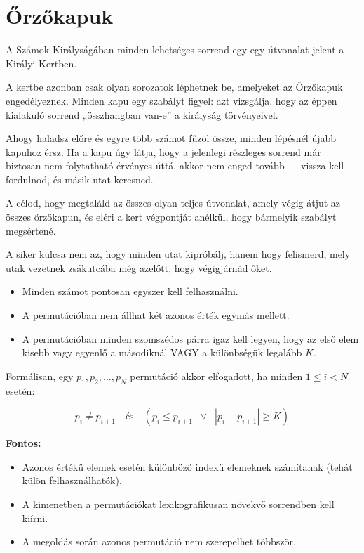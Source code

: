 \documentclass[12pt,a4paper]{article}
\begin{document}
\section{Őrzőkapuk}

A Számok Királyságában minden lehetséges sorrend egy-egy útvonalat jelent a Királyi Kertben.

A kertbe azonban csak olyan sorozatok léphetnek be, amelyeket az Őrzőkapuk engedélyeznek. Minden kapu egy szabályt figyel: azt vizsgálja, hogy az éppen kialakuló sorrend „összhangban van-e” a királyság törvényeivel.

Ahogy haladsz előre és egyre több számot fűzöl össze, minden lépésnél újabb kapuhoz érsz. Ha a kapu úgy látja, hogy a jelenlegi részleges sorrend már biztosan nem folytatható érvényes úttá, akkor nem enged tovább — vissza kell fordulnod, és másik utat keresned.

A célod, hogy megtaláld az összes olyan teljes útvonalat, amely végig átjut az összes őrzőkapun, és eléri a kert végpontját anélkül, hogy bármelyik szabályt megsértené.

A siker kulcsa nem az, hogy minden utat kipróbálj, hanem hogy felismerd, mely utak vezetnek zsákutcába még azelőtt, hogy végigjárnád őket.

\begin{itemize}
    \item Minden számot pontosan egyszer kell felhasználni.
    \item A permutációban nem állhat két azonos érték egymás mellett.
    \item A permutációban minden szomszédos párra igaz kell legyen, hogy az első elem kisebb vagy egyenlő a másodiknál VAGY a különbségük legalább $K$.
\end{itemize}

Formálisan, egy $p_1, p_2, \dots, p_N$ permutáció akkor elfogadott, ha minden $1 \le i < N$ esetén:

\[
p_i \neq p_{i+1} \quad \text{és} \quad (p_i \le p_{i+1} \;\; \lor \;\; |p_i - p_{i+1}| \ge K)
\]

\textbf{Fontos:}
\begin{itemize}
    \item Azonos értékű elemek esetén különböző indexű elemeknek számítanak (tehát külön felhasználhatók).
    \item A kimenetben a permutációkat lexikografikusan növekvő sorrendben kell kiírni.
    \item A megoldás során azonos permutáció nem szerepelhet többször.
\end{itemize}
\end{document}
